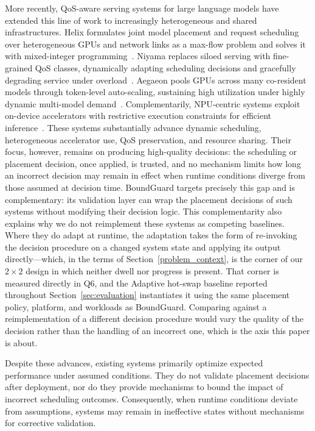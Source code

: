 \documentclass[conference]{IEEEtran}
\begin{document}
{More recently, QoS-aware serving systems for large language models have extended this line of work to increasingly heterogeneous and shared infrastructures.
Helix formulates joint model placement and request scheduling over heterogeneous GPUs and network links as a max-flow problem and solves it with mixed-integer programming~\cite{helix2025asplos}.
Niyama replaces siloed serving with fine-grained QoS classes, dynamically adapting scheduling decisions and gracefully degrading service under overload~\cite{niyama2025}.
Aegaeon pools GPUs across many co-resident models through token-level auto-scaling, sustaining high utilization under highly dynamic multi-model demand~\cite{aegaeon2025sosp}.
Complementarily, NPU-centric systems exploit on-device accelerators with restrictive execution constraints for efficient inference~\cite{llmnpu2025asplos}.
These systems substantially advance dynamic scheduling, heterogeneous accelerator use, QoS preservation, and resource sharing.
Their focus, however, remains on producing high-quality decisions: the scheduling or placement decision, once applied, is trusted, and no mechanism limits how long an incorrect decision may remain in effect when runtime conditions diverge from those assumed at decision time.
BoundGuard targets precisely this gap and is complementary: its validation layer can wrap the placement decisions of such systems without modifying their decision logic.
\textcolor{navyblue}{This complementarity also explains why we do not reimplement these systems as competing baselines. Where they do adapt at runtime, the adaptation takes the form of re-invoking the decision procedure on a changed system state and applying its output directly---which, in the terms of Section~\ref{problem_context}, is the corner of our $2\times2$ design in which neither dwell nor progress is present. That corner is measured directly in Q6, and the Adaptive hot-swap baseline reported throughout Section~\ref{sec:evaluation} instantiates it using the same placement policy, platform, and workloads as BoundGuard. Comparing against a reimplementation of a different decision procedure would vary the quality of the decision rather than the handling of an incorrect one, which is the axis this paper is about.}

Despite these advances, existing systems primarily optimize expected performance under assumed conditions.
They do not validate placement decisions after deployment, nor do they provide mechanisms to bound the impact of incorrect scheduling outcomes.
Consequently, when runtime conditions deviate from assumptions, systems may remain in ineffective states without mechanisms for corrective validation.


}
\end{document}
